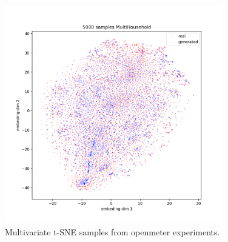\begin{figure}
    \centering
    \includegraphics[width=0.85\textwidth]{images/om_multi_tsne.png}
    \caption{Multivariate t-SNE samples from openmeter experiments.}
    \label{fig:om tsne multi}
\end{figure}
